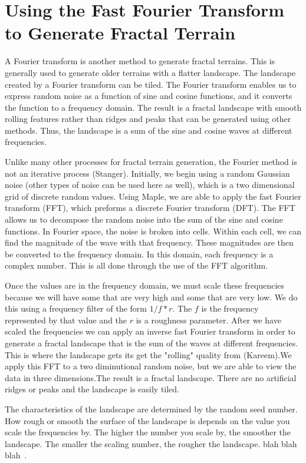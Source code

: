 \documentclass{article}
\begin{document}
	\section{Using the Fast Fourier Transform to Generate Fractal Terrain} 
	\label{sec:FFT}
	A Fourier transform is another method to generate fractal terrains. This is generally used to generate older terrains with a flatter landscape. The landscape created by a Fourier transform can be tiled. The Fourier transform enables us to express random noise as a function of sine and cosine functions, and it converts the function to a frequency domain. The result is a fractal landscape with smooth rolling features rather than ridges and peaks that can be generated using other methods. Thus, the landscape is a sum of the sine and cosine waves at different frequencies.
	
	Unlike many other processes for fractal terrain generation, the Fourier method is not an iterative process (Stanger). Initially, we begin using a random Gaussian noise (other types of noise can be used here as well), which is a two dimensional grid of discrete random values. Using Maple, we are able to apply the fast Fourier transform (FFT), which preforms a discrete Fourier transform (DFT). The FFT allows us to decompose the random noise into the sum of the sine and cosine functions. In Fourier space, the noise is broken into cells. Within each cell, we can find the magnitude of the wave with that frequency. These magnitudes are then be converted to the frequency domain. In this domain, each frequency is a complex number. This is all done through the use of the FFT algorithm.
	
	Once the values are in the frequency domain, we must scale these frequencies because we will have some that are very high and some that are very low. We do this using a frequency filter of the form $1/f*r$. The $f$ is the frequency represented by that value and the $r$ is a roughness parameter. After we have scaled the frequencies we can apply an inverse fast Fourier transform in order to generate a fractal landscape that is the sum of the waves at different frequencies. This is where the landscape gets its get the "rolling" quality from (Kareem).We apply this FFT to a two diminutional random noise, but we are able to view the data in three dimensions.The result is a fractal landscape. There are no artificial ridges or peaks and the landscape is easily tiled.
	
	The characteristics of the landscape are determined by the random seed number. How rough or smooth the surface of the landscape is depends on the value you scale the frequencies by. The higher the number you scale by, the smoother the landscape. The smaller the scaling number, the rougher the landscape.
	    blah blah blah~\cite{Jo09, PaperII}.
     
    
    

     

    
\end{document}

